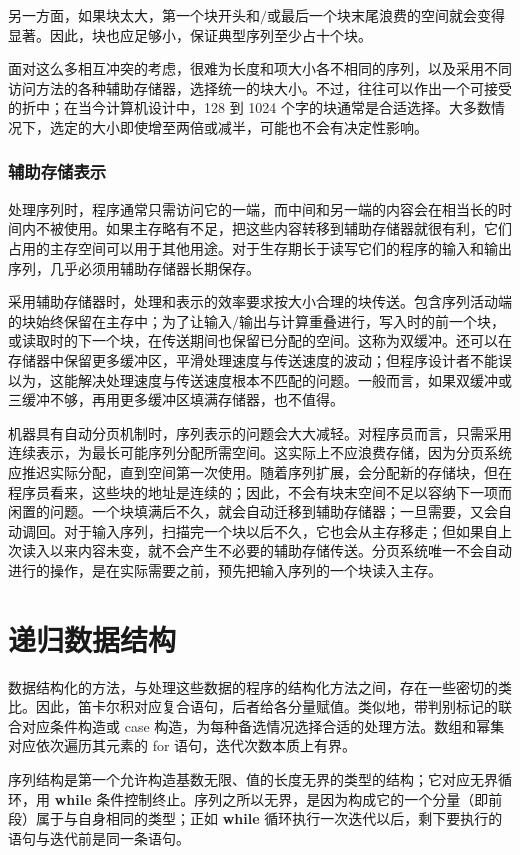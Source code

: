 \documentclass[twoside,11pt,fontset=none]{ctexbook}
\begin{document}
另一方面，如果块太大，第一个块开头和$/$或最后一个块末尾浪费的空间就会变得显著。因此，块也应足够小，保证典型序列至少占十个块。

面对这么多相互冲突的考虑，很难为长度和项大小各不相同的序列，以及采用不同访问方法的各种辅助存储器，选择统一的块大小。不过，往往可以作出一个可接受的折中；在当今计算机设计中，128 到 1024 个字的块通常是合适选择。大多数情况下，选定的大小即使增至两倍或减半，可能也不会有决定性影响。

\subsubsection{辅助存储表示}

处理序列时，程序通常只需访问它的一端，而中间和另一端的内容会在相当长的时间内不被使用。如果主存略有不足，把这些内容转移到辅助存储器就很有利，它们占用的主存空间可以用于其他用途。对于生存期长于读写它们的程序的输入和输出序列，几乎必须用辅助存储器长期保存。

采用辅助存储器时，处理和表示的效率要求按大小合理的块传送。包含序列活动端的块始终保留在主存中；为了让输入$/$输出与计算重叠进行，写入时的前一个块，或读取时的下一个块，在传送期间也保留已分配的空间。这称为双缓冲。还可以在存储器中保留更多缓冲区，平滑处理速度与传送速度的波动；但程序设计者不能误以为，这能解决处理速度与传送速度根本不匹配的问题。一般而言，如果双缓冲或三缓冲不够，再用更多缓冲区填满存储器，也不值得。

机器具有自动分页机制时，序列表示的问题会大大减轻。对程序员而言，只需采用连续表示，为最长可能序列分配所需空间。这实际上不应浪费存储，因为分页系统应推迟实际分配，直到空间第一次使用。随着序列扩展，会分配新的存储块，但在程序员看来，这些块的地址是连续的；因此，不会有块末空间不足以容纳下一项而闲置的问题。一个块填满后不久，就会自动迁移到辅助存储器；一旦需要，又会自动调回。对于输入序列，扫描完一个块以后不久，它也会从主存移走；但如果自上次读入以来内容未变，就不会产生不必要的辅助存储传送。分页系统唯一不会自动进行的操作，是在实际需要之前，预先把输入序列的一个块读入主存。
\section[递归数据结构]{递归数据结构}

数据结构化的方法，与处理这些数据的程序的结构化方法之间，存在一些密切的类比。因此，笛卡尔积对应复合语句，后者给各分量赋值。类似地，带判别标记的联合对应条件构造或 case 构造，为每种备选情况选择合适的处理方法。数组和幂集对应依次遍历其元素的 for 语句，迭代次数本质上有界。

序列结构是第一个允许构造基数无限、值的长度无界的类型的结构；它对应无界循环，用 \textbf{while} 条件控制终止。序列之所以无界，是因为构成它的一个分量（即前段）属于与自身相同的类型；正如 \textbf{while} 循环执行一次迭代以后，剩下要执行的语句与迭代前是同一条语句。
\end{document}
